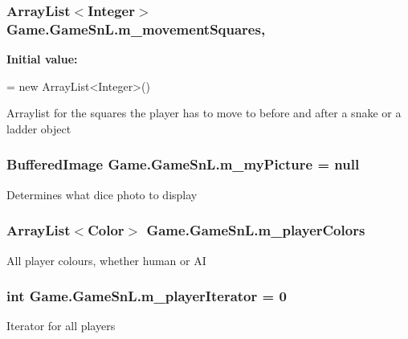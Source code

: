 \subsubsection[{m\+\_\+movement\+Squares}]{\setlength{\rightskip}{0pt plus 5cm}Array\+List$<$Integer$>$ Game.\+Game\+Sn\+L.\+m\+\_\+movement\+Squares\hspace{0.3cm}{\ttfamily [static]}, {\ttfamily [private]}}\label{class_game_1_1_game_sn_l_af8c7ff07d44c8713db098772d7888478}
{\bfseries Initial value\+:}
\begin{DoxyCode}
= 
            \textcolor{keyword}{new} ArrayList<Integer>()
\end{DoxyCode}
Arraylist for the squares the player has to move to before and after a snake or a ladder object \hypertarget{class_game_1_1_game_sn_l_af12170048b789d0c3303ab35c9b58413}{}
\subsubsection[{m\+\_\+my\+Picture}]{\setlength{\rightskip}{0pt plus 5cm}Buffered\+Image Game.\+Game\+Sn\+L.\+m\+\_\+my\+Picture = null\hspace{0.3cm}{\ttfamily [private]}}\label{class_game_1_1_game_sn_l_af12170048b789d0c3303ab35c9b58413}
Determines what dice photo to display \hypertarget{class_game_1_1_game_sn_l_aab5fbfe1044b0a403fdfa7634c0c344b}{}
\subsubsection[{m\+\_\+player\+Colors}]{\setlength{\rightskip}{0pt plus 5cm}Array\+List$<$Color$>$ Game.\+Game\+Sn\+L.\+m\+\_\+player\+Colors\hspace{0.3cm}{\ttfamily [private]}}\label{class_game_1_1_game_sn_l_aab5fbfe1044b0a403fdfa7634c0c344b}
All player colours, whether human or A\+I \hypertarget{class_game_1_1_game_sn_l_a4cff3283ef1f344a871b2019ae92dd57}{}
\subsubsection[{m\+\_\+player\+Iterator}]{\setlength{\rightskip}{0pt plus 5cm}int Game.\+Game\+Sn\+L.\+m\+\_\+player\+Iterator = 0\hspace{0.3cm}{\ttfamily [private]}}\label{class_game_1_1_game_sn_l_a4cff3283ef1f344a871b2019ae92dd57}
Iterator for all players \hypertarget{class_game_1_1_game_sn_l_a0faf146bfc9f0bd5814b3b3c71c00a20}{}

